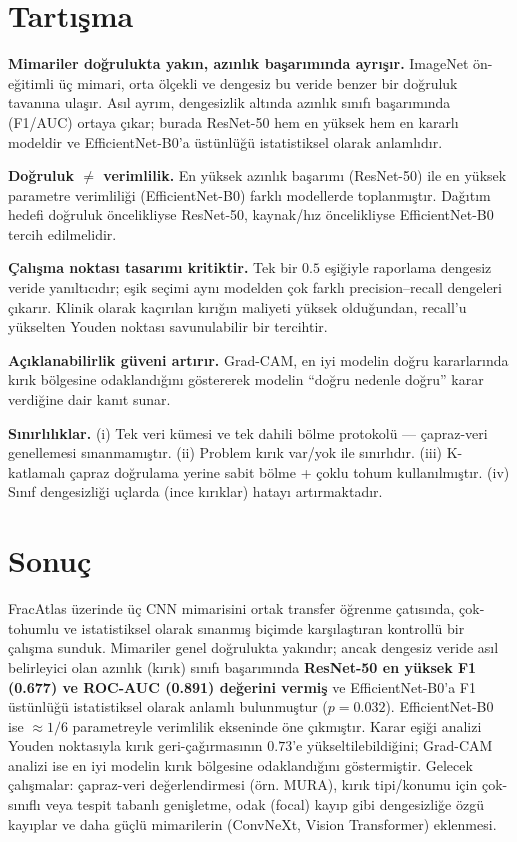\documentclass[conference]{IEEEtran}
\begin{document}
\section{Tartışma}
\textbf{Mimariler doğrulukta yakın, azınlık başarımında ayrışır.} ImageNet ön-eğitimli üç mimari, orta ölçekli ve dengesiz bu veride benzer bir doğruluk tavanına ulaşır. Asıl ayrım, dengesizlik altında azınlık sınıfı başarımında (F1/AUC) ortaya çıkar; burada ResNet-50 hem en yüksek hem en kararlı modeldir ve EfficientNet-B0'a üstünlüğü istatistiksel olarak anlamlıdır.

\textbf{Doğruluk $\neq$ verimlilik.} En yüksek azınlık başarımı (ResNet-50) ile en yüksek parametre verimliliği (EfficientNet-B0) farklı modellerde toplanmıştır. Dağıtım hedefi doğruluk öncelikliyse ResNet-50, kaynak/hız öncelikliyse EfficientNet-B0 tercih edilmelidir.

\textbf{Çalışma noktası tasarımı kritiktir.} Tek bir $0.5$ eşiğiyle raporlama dengesiz veride yanıltıcıdır; eşik seçimi aynı modelden çok farklı precision--recall dengeleri çıkarır. Klinik olarak kaçırılan kırığın maliyeti yüksek olduğundan, recall'u yükselten Youden noktası savunulabilir bir tercihtir.

\textbf{Açıklanabilirlik güveni artırır.} Grad-CAM, en iyi modelin doğru kararlarında kırık bölgesine odaklandığını göstererek modelin ``doğru nedenle doğru'' karar verdiğine dair kanıt sunar.

\textbf{Sınırlılıklar.} (i) Tek veri kümesi ve tek dahili bölme protokolü --- çapraz-veri genellemesi sınanmamıştır. (ii) Problem kırık var/yok ile sınırlıdır. (iii) K-katlamalı çapraz doğrulama yerine sabit bölme + çoklu tohum kullanılmıştır. (iv) Sınıf dengesizliği uçlarda (ince kırıklar) hatayı artırmaktadır.

\section{Sonuç}
FracAtlas üzerinde üç CNN mimarisini ortak transfer öğrenme çatısında, çok-tohumlu ve istatistiksel olarak sınanmış biçimde karşılaştıran kontrollü bir çalışma sunduk. Mimariler genel doğrulukta yakındır; ancak dengesiz veride asıl belirleyici olan azınlık (kırık) sınıfı başarımında \textbf{ResNet-50 en yüksek F1 (0.677) ve ROC-AUC (0.891) değerini vermiş} ve EfficientNet-B0'a F1 üstünlüğü istatistiksel olarak anlamlı bulunmuştur ($p = 0.032$). EfficientNet-B0 ise $\approx 1/6$ parametreyle verimlilik ekseninde öne çıkmıştır. Karar eşiği analizi Youden noktasıyla kırık geri-çağırmasının $0.73$'e yükseltilebildiğini; Grad-CAM analizi ise en iyi modelin kırık bölgesine odaklandığını göstermiştir. Gelecek çalışmalar: çapraz-veri değerlendirmesi (örn. MURA), kırık tipi/konumu için çok-sınıflı veya tespit tabanlı genişletme, odak (focal) kayıp gibi dengesizliğe özgü kayıplar ve daha güçlü mimarilerin (ConvNeXt, Vision Transformer) eklenmesi.
\end{document}
